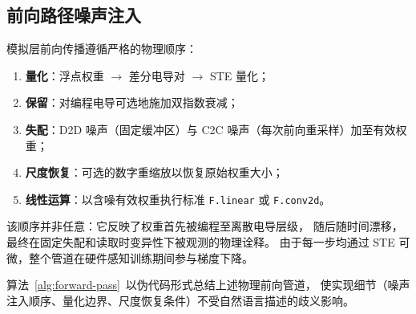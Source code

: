 \subsection{前向路径噪声注入}

模拟层前向传播遵循严格的物理顺序：
\begin{enumerate}
\item \textbf{量化}：浮点权重 $\rightarrow$ 差分电导对 $\rightarrow$ STE 量化；
\item \textbf{保留}：对编程电导可选地施加双指数衰减；
\item \textbf{失配}：D2D 噪声（固定缓冲区）与 C2C 噪声（每次前向重采样）加至有效权重；
\item \textbf{尺度恢复}：可选的数字重缩放以恢复原始权重大小；
\item \textbf{线性运算}：以含噪有效权重执行标准 \texttt{F.linear} 或 \texttt{F.conv2d}。
\end{enumerate}

该顺序并非任意：它反映了权重首先被编程至离散电导层级，
随后随时间漂移，最终在固定失配和读取时变异性下被观测的物理诠释。
由于每一步均通过 STE 可微，整个管道在硬件感知训练期间参与梯度下降。

算法~\ref{alg:forward-pass}~以伪代码形式总结上述物理前向管道，
使实现细节（噪声注入顺序、量化边界、尺度恢复条件）不受自然语言描述的歧义影响。

